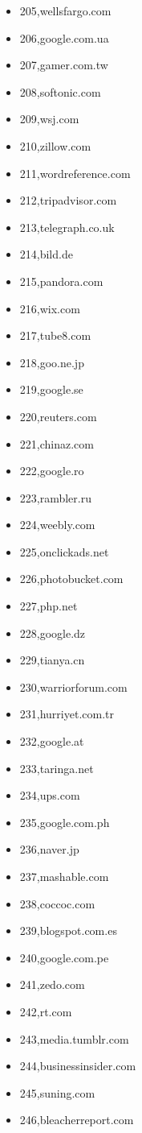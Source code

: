 \begin{multicols}{3}
\begin{itemize}
	\item 205,wellsfargo.com
	\item 206,google.com.ua
	\item 207,gamer.com.tw
	\item 208,softonic.com
	\item 209,wsj.com
	\item 210,zillow.com
	\item 211,wordreference.com
	\item 212,tripadvisor.com
	\item 213,telegraph.co.uk
	\item 214,bild.de
	\item 215,pandora.com
	\item 216,wix.com
	\item 217,tube8.com
	\item 218,goo.ne.jp
	\item 219,google.se
	\item 220,reuters.com
	\item 221,chinaz.com
	\item 222,google.ro
	\item 223,rambler.ru
	\item 224,weebly.com
	\item 225,onclickads.net
	\item 226,photobucket.com
	\item 227,php.net
	\item 228,google.dz
	\item 229,tianya.cn
	\item 230,warriorforum.com
	\item 231,hurriyet.com.tr
	\item 232,google.at
	\item 233,taringa.net
	\item 234,ups.com
	\item 235,google.com.ph
	\item 236,naver.jp
	\item 237,mashable.com
	\item 238,coccoc.com
	\item 239,blogspot.com.es
	\item 240,google.com.pe
	\item 241,zedo.com
	\item 242,rt.com
	\item 243,media.tumblr.com
	\item 244,businessinsider.com
	\item 245,suning.com
	\item 246,bleacherreport.com

\end{itemize}
\end{multicols}
